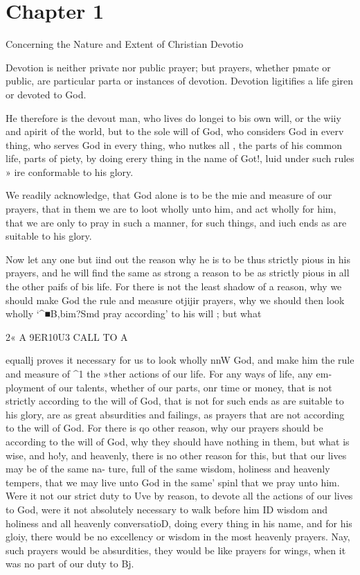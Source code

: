 \documentclass[
]{book}
\begin{document}
\clearpage
\setcounter{page}{1}

\hypertarget{chapter-1}{%
\chapter{Chapter 1}\label{chapter-1}}

Concerning the Nature and Extent of Christian Devotio

Devotion is neither private nor public prayer; but prayers, whether pmate or public, are particular parta or instances of devotion. Devotion ligitifies a life giren or devoted to God.

He therefore is the devout man, who lives do longei to bis own will, or the wiiy and apirit of the world, but to the sole will of God, who considers God in everv thing, who serves God in every thing, who nutkes all , the parts of his common life, parts of piety, by doing erery thing in the name of Got!, luid under such rules » ire conformable to his glory.

We readily acknowledge, that God alone is to be the mie and measure of our prayers, that in them we are to loot wholly unto him, and act wholly for him, that we are only to pray in such a manner, for such things, and iuch ends as are suitable to his glory.

Now let any one but iind out the reason why he is to be thus strictly pious in his prayers, and he will find the same as strong a reason to be as strictly pious in all the other paifs of bis life. For there is not the least shadow of a reason, why we should make God the rule and measure otjijir prayers, why we should then look wholly `\^{}■\textbar B,bim?Smd pray according' to his will ; but what

2« A 9ER10U3 CALL TO A

equallj proves it necessary for us to look wholly nnW God, and make him the rule and measure of \^{}1 the »ther actions of our life. For any ways of life, any em- ployment of our talents, whether of our parts, onr time or money, that is not strictly according to the will of God, that is not for such ends as are suitable to his glory, are as great absurdities and failings, as prayers that are not according to the will of God. For there is qo other reason, why our prayers should be according to the will of God, why they should have nothing in them, but what is wise, and ho!y, and heavenly, there is no other reason for this, but that our lives may be of the same na- ture, full of the same wisdom, holiness and heavenly tempers, that we may live unto God in the same' spinl that we pray unto him. Were it not our strict duty to Uve by reason, to devote all the actions of our lives to God, were it not absolutely necessary to walk before him ID wisdom and holiness and all heavenly conversatioD, doing every thing in his name, and for his gloiy, there would be no excellency or wisdom in the most heavenly prayers. Nay, such prayers would be absurdities, they would be like prayers for wings, when it was no part of our duty to Bj.
\end{document}
